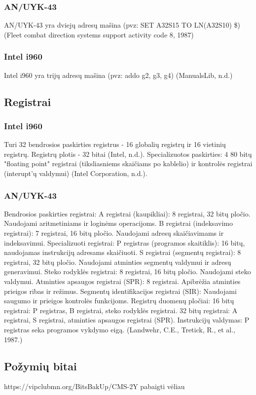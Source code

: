\documentclass{article}
\begin{document}
\subsubsection{AN/UYK-43}
AN/UYK-43 yra dviejų adresų mašina (pvz: SET A32S15 TO LN(A32S10) \$) (Fleet combat direction systems support activity code 8, 1987)
\subsubsection{Intel i960}
Intel i960 yra trijų adresų mašina (pvz: addo g2, g3, g4) (ManualsLib, n.d.)
\subsection{Registrai}
\subsubsection{Intel i960}
Turi 32 bendrosios paskirties registrus - 16 globalių registrų ir 16 vietinių registrų. Registrų plotis - 32 bitai (Intel, n.d.). Specializuotos paskirties: 4 80 bitų "floating point" registrai (tiksliasniems skaičiams po kablelio) ir kontrolės registrai (interupt'ų valdymui) (Intel Corporation, n.d.).
\subsubsection{AN/UYK-43}
Bendrosios paskirties registrai: A registrai (kaupikliai): 8 registrai, 32 bitų pločio. Naudojami aritmetiniams ir loginėms operacijoms.
B registrai (indeksavimo registrai): 7 registrai, 16 bitų pločio. Naudojami adresų skaičiavimams ir indeksavimui. Specializuoti registrai: P registras (programos skaitiklis): 16 bitų, naudojamas instrukcijų adresams skaičiuoti. S registrai (segmentų registrai): 8 registrai, 32 bitų pločio. Naudojami atminties segmentų valdymui ir adresų generavimui.
Steko rodyklės registrai: 8 registrai, 16 bitų pločio. Naudojami steko valdymui. Atminties apsaugos registrai (SPR): 8 registrai. Apibrėžia atminties prieigos ribas ir režimus. Segmentų identifikacijos registrai (SIR): Naudojami saugumo ir prieigos kontrolės funkcijoms. Registrų duomenų pločiai: 16 bitų registrai: P registras, B registrai, steko rodyklės registrai. 32 bitų registrai: A registrai, S registrai, atminties apsaugos registrai (SPR). Instrukcijų valdymas: P registras seka programos vykdymo eigą. (Landwehr, C.E., Tretick, R., et al., 1987.)
\subsection{Požymių bitai}
https://vipclubmn.org/BitsBakUp/CMS-2Y%
pabaigti vėliau
\end{document}
